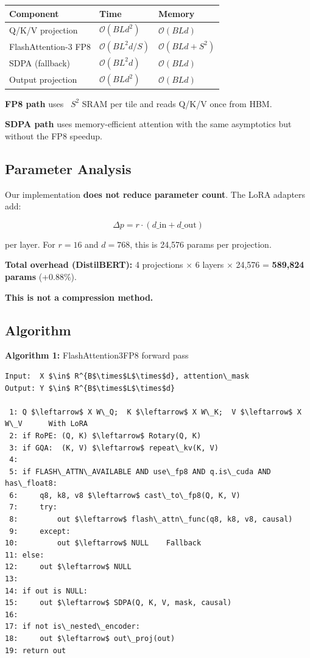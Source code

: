 \begin{table}[H]
\centering
\small
\begin{tabular}{lll}
\toprule
\textbf{Component} & \textbf{Time} & \textbf{Memory} \\
\midrule
Q/K/V projection & $\mathcal{O}(BLd^2)$ & $\mathcal{O}(BLd)$ \\
FlashAttention-3 FP8 & $\mathcal{O}(BL^2 d / S)$ & $\mathcal{O}(BLd + S^2)$ \\
SDPA (fallback) & $\mathcal{O}(BL^2 d)$ & $\mathcal{O}(BLd)$ \\
Output projection & $\mathcal{O}(BLd^2)$ & $\mathcal{O}(BLd)$ \\
\bottomrule
\end{tabular}
\end{table}

\textbf{FP8 path} uses ~$S^2$ SRAM per tile and reads Q/K/V once from HBM.

\textbf{SDPA path} uses memory-efficient attention with the same asymptotics but 
without the FP8 speedup.

\subsection{Parameter Analysis}

Our implementation \textbf{does not reduce parameter count}. The LoRA adapters 
add:

\[
\Delta p = r \cdot (d\_\text{in} + d\_\text{out})
\tag{4.1}
\]

per layer. For $r = 16$ and $d = 768$, this is 24,576 params per projection.

\textbf{Total overhead (DistilBERT):} 4 projections $\times$ 6 layers $\times$ 24,576 = 
\textbf{589,824 params} (+0.88\%).

\textbf{This is not a compression method.}

\subsection{Algorithm}

\textbf{Algorithm 1:} FlashAttention3FP8 forward pass
\begin{lstlisting}
Input:  X $\in$ R^{B$\times$L$\times$d}, attention\_mask
Output: Y $\in$ R^{B$\times$L$\times$d}

 1: Q $\leftarrow$ X W\_Q;  K $\leftarrow$ X W\_K;  V $\leftarrow$ X W\_V      With LoRA
 2: if RoPE: (Q, K) $\leftarrow$ Rotary(Q, K)
 3: if GQA:  (K, V) $\leftarrow$ repeat\_kv(K, V)
 4:
 5: if FLASH\_ATTN\_AVAILABLE AND use\_fp8 AND q.is\_cuda AND has\_float8:
 6:     q8, k8, v8 $\leftarrow$ cast\_to\_fp8(Q, K, V)
 7:     try:
 8:         out $\leftarrow$ flash\_attn\_func(q8, k8, v8, causal)
 9:     except:
10:         out $\leftarrow$ NULL    Fallback
11: else:
12:     out $\leftarrow$ NULL
13:
14: if out is NULL:
15:     out $\leftarrow$ SDPA(Q, K, V, mask, causal)
16:
17: if not is\_nested\_encoder:
18:     out $\leftarrow$ out\_proj(out)
19: return out
\end{lstlisting}



